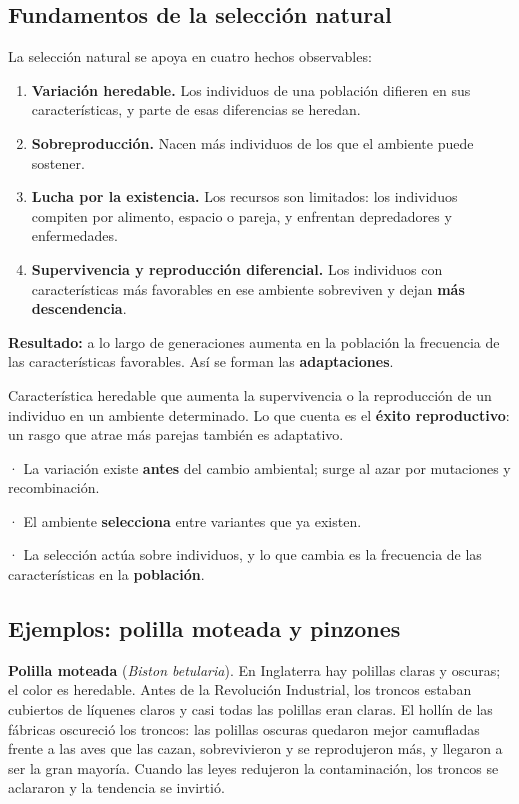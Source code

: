 \subsection{Fundamentos de la selección natural}
La selección natural se apoya en cuatro hechos observables:

 
\begin{enumerate}
  \item \textbf{Variación heredable.} Los individuos de una población difieren en sus características, y parte de esas diferencias se heredan.
  \item \textbf{Sobreproducción.} Nacen más individuos de los que el ambiente puede sostener.
  \item \textbf{Lucha por la existencia.} Los recursos son limitados: los individuos compiten por alimento, espacio o pareja, y enfrentan depredadores y enfermedades.
  \item \textbf{Supervivencia y reproducción diferencial.} Los individuos con características más favorables en ese ambiente sobreviven y dejan \textbf{más descendencia}.
\end{enumerate}
 

\textbf{Resultado:} a lo largo de generaciones aumenta en la población la frecuencia de las características favorables. Así se forman las \textbf{adaptaciones}.

  
\begin{clave}[{Adaptación}] Característica heredable que aumenta la supervivencia o la reproducción de un individuo en un ambiente determinado. Lo que cuenta es el \textbf{éxito reproductivo}: un rasgo que atrae más parejas también es adaptativo.\end{clave}
 
\begin{clave}[{Recuerda}] · La variación existe \textbf{antes} del cambio ambiental; surge al azar por mutaciones y recombinación.\par · El ambiente \textbf{selecciona} entre variantes que ya existen.\par · La selección actúa sobre individuos, y lo que cambia es la frecuencia de las características en la \textbf{población}.\end{clave}
\subsection{Ejemplos: polilla moteada y pinzones}
\textbf{Polilla moteada} (\emph{Biston betularia}). En Inglaterra hay polillas claras y oscuras; el color es heredable. Antes de la Revolución Industrial, los troncos estaban cubiertos de líquenes claros y casi todas las polillas eran claras. El hollín de las fábricas oscureció los troncos: las polillas oscuras quedaron mejor camufladas frente a las aves que las cazan, sobrevivieron y se reprodujeron más, y llegaron a ser la gran mayoría. Cuando las leyes redujeron la contaminación, los troncos se aclararon y la tendencia se invirtió.

